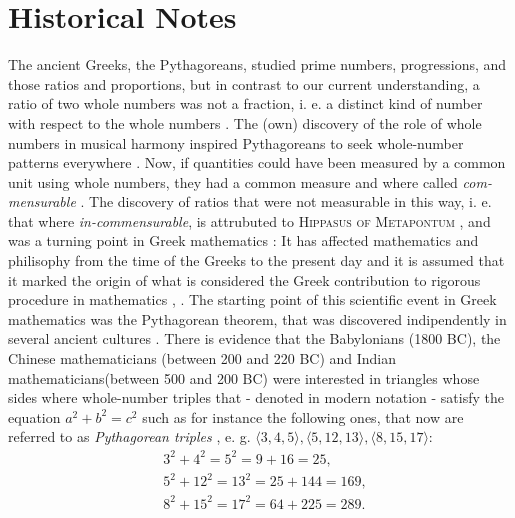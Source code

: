 \documentclass[11pt]{amsart}
\theoremstyle{definition}
\begin{document}
\section{Historical Notes}
The ancient Greeks, the Pythagoreans, studied prime numbers, progressions, and those ratios and proportions, but in contrast to our current understanding, a ratio of two whole numbers was not a fraction, i. e. a distinct kind of number with respect to the whole numbers \cite[32]{klineMathematicalThoughtAncient1990}.
The (own) discovery of the role of whole numbers in musical harmony inspired Pythagoreans to seek whole-number patterns everywhere \cite[11]{stillwellMathematicsItsHistory2010}.
Now, if quantities could have been measured by a common unit using whole numbers, they had a common measure and where called \emph{com-mensurable} \cite[32]{klineMathematicalThoughtAncient1990}.
The discovery of ratios that were not measurable in this way, i. e. that where \emph{in-commensurable}, is attrubuted to \textsc{Hippasus of Metapontum} \cite[32]{klineMathematicalThoughtAncient1990}, and was a turning point in Greek mathematics \cite[1]{stillwellStoryProofLogic2022}: It has affected mathematics and philisophy from the time of the Greeks to the present day \cite[59-60]{courantWhatMathematicsElementary1996} and it is assumed that it marked the origin of what is considered the Greek contribution to rigorous procedure in mathematics \cite[59]{courantWhatMathematicsElementary1996}, \cite[1]{stillwellStoryProofLogic2022}.
The starting point of this scientific event \cite[59]{courantWhatMathematicsElementary1996} in Greek mathematics was the Pythagorean theorem, that was discovered indipendently in several ancient cultures \cite[3]{stillwellStoryProofLogic2022}.
There is evidence \cite[4]{stillwellMathematicsItsHistory2010} that the Babylonians (1800 BC), the Chinese mathematicians (between 200 and 220 BC) and Indian mathematicians(between 500 and 200 BC) were interested in triangles whose sides where whole-number triples that - denoted in modern notation - satisfy the equation \(a^{2} + b^{2} = c^{2}\) \cite[3-4]{stillwellStoryProofLogic2022} such as for instance the following ones, that now are referred to as \emph{Pythagorean triples} \cite[4]{stillwellMathematicsItsHistory2010}, e. g. \(\langle 3, 4, 5 \rangle, \langle 5, 12, 13 \rangle, \langle 8, 15, 17 \rangle\):
\begin{align*}
     & 3^{2} + 4^{2}  =  5^{2}  = 9 + 16 = 25,     \\
     & 5^{2} + 12^{2} =  13^{2}  = 25 + 144 = 169, \\
     & 8^{2} + 15^{2} = 17^{2} = 64 + 225 = 289.
\end{align*}
\end{document}
